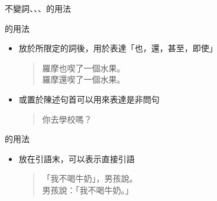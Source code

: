 \documentclass[aspectratio=169]{beamer}
\begin{document}
\begin{frame}{不變詞、、、的用法}
    \begin{block}{的用法}
        \begin{itemize}
            \item {}放於所限定的詞後，用於表達「也，還，甚至，即使」\\
            \begin{quotation}
                \rmfamily
                 羅摩也喫了一個水果。\\
                 羅摩還喫了一個水果。\\
            \end{quotation}
            \item {}或置於陳述句首可以用來表達是非問句\\
            \begin{quotation}
                \rmfamily
                 你去學校嗎？
            \end{quotation}
        \end{itemize}
    \end{block}

    \begin{block}{的用法}
        \begin{itemize}
            \item {}放在引語末，可以表示直接引語\\
            \begin{quotation}
                \rmfamily
                 「我不喝牛奶」，男孩說。\\
                 男孩說：「我不喝牛奶。」
            \end{quotation}
        \end{itemize}
    \end{block}
\end{frame}
\end{document}
